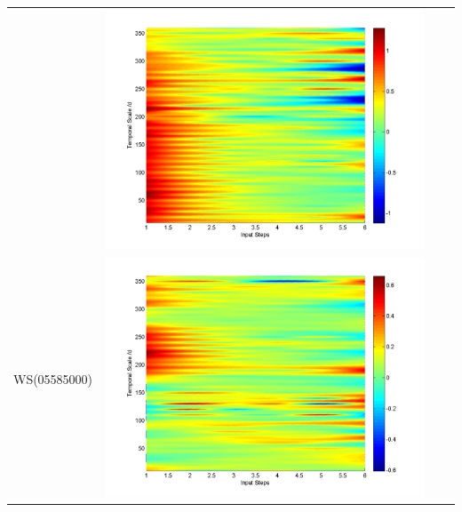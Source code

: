\documentclass[11pt]{article}
\begin{document}
\begin{table}[H]
{\begin{tabular}{cccc}
&\begin{minipage}{.3\textwidth}\includegraphics[width=\linewidth]{resultgraph/02143000qdiff_former.png}\end{minipage}
\\
WS(05585000)
&\begin{minipage}{.3\textwidth}\includegraphics[width=\linewidth]{resultgraph/05585000pdiff_former.png}\end{minipage}

\end{tabular}}
\end{table}
\end{document}
